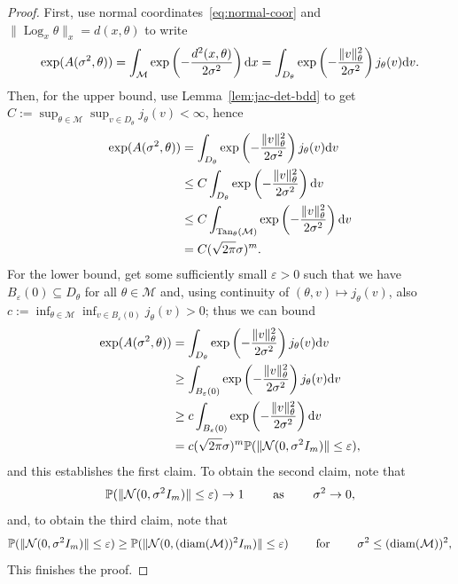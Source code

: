\documentclass[preprint]{imsart}
\theoremstyle{plain}
\theoremstyle{definition}
\newcommand{\Pbb}{\mathbb{P}}
\newcommand{\Ncal}{\mathcal{N}}
\newcommand{\Mcal}{\mathcal{M}}
\newcommand{\diff}{\textnormal{d}}
\DeclareMathOperator{\Tan}{Tan}
\DeclareMathOperator{\Log}{Log}
\DeclareMathOperator{\diam}{diam}
\begin{document}
\begin{appendix}
\begin{proof}
    First, use normal coordinates~\eqref{eq:normal-coor} and $\|\Log_x\theta\|_x =d(x,\theta)$ to write
    \begin{equation*}
        \exp(A(\sigma^2,\theta))= \int_{\Mcal}\exp\left(-\frac{d^2(x,\theta)}{2\sigma^2}\right)\diff x = \int_{D_\theta}\exp\left(-\frac{\|v\|^2_{\theta}}{2\sigma^2}\right)j_{\theta}(v)\diff v.
    \end{equation*}
    Then, for the upper bound, use Lemma~\ref{lem:jac-det-bdd} to get $C:=\sup_{\theta\in\Mcal}\sup_{v\in D_\theta} j_\theta(v)<\infty$, hence
    \begin{align*}
        \exp(A(\sigma^2,\theta)) &= \int_{D_\theta}\exp\left(-\frac{\|v\|^2_{\theta}}{2\sigma^2}\right)j_{\theta}(v)\diff v \\
        &\le C\int_{D_\theta}\exp\left(-\frac{\|v\|^2_{\theta}}{2\sigma^2}\right)\diff v \\
        &\le C\int_{\Tan_{\theta}(\Mcal)}\exp\left(-\frac{\|v\|^2_{\theta}}{2\sigma^2}\right)\diff v \\
        &= C(\sqrt{2\pi}\sigma)^m.
    \end{align*}
    For the lower bound, get some sufficiently small $\varepsilon>0$ such that we have $B_{\varepsilon}(0)\subseteq D_\theta$ for all $\theta\in\Mcal$ and, using continuity of $(\theta,v)\mapsto j_\theta(v)$,  also $c:=\inf_{\theta\in\Mcal}\inf_{v\in B_{\varepsilon}(0)}j_\theta(v)>0$; thus we can bound
    \begin{align*}
        \exp(A(\sigma^2,\theta)) &= \int_{D_\theta}\exp\left(-\frac{\|v\|^2_{\theta}}{2\sigma^2}\right)j_{\theta}(v)\diff v \\
        &\ge \int_{B_{\varepsilon}(0)}\exp\left(-\frac{\|v\|^2_{\theta}}{2\sigma^2}\right)j_{\theta}(v)\diff v \\
        &\ge c\int_{B_{\varepsilon}(0)}\exp\left(-\frac{\|v\|^2_{\theta}}{2\sigma^2}\right)\diff v \\
        &= c(\sqrt{2\pi}\sigma)^m\Pbb(\|\Ncal(0,\sigma^2I_m)\|\le \varepsilon),
    \end{align*}
    and this establishes the first claim.
    To obtain the second claim, note that 
    \begin{equation*}
        \Pbb(\|\Ncal(0,\sigma^2I_m)\|\le \varepsilon)\to 1\qquad \textnormal{ as }\qquad \sigma^2\to 0,
    \end{equation*}
    and, to obtain the third claim, note that
    \begin{equation*}
        \Pbb(\|\Ncal(0,\sigma^2I_m)\|\le \varepsilon)\ge \Pbb(\|\Ncal(0,(\diam(\Mcal))^2I_m)\|\le \varepsilon)\qquad \textnormal{ for }\qquad \sigma^2\le (\diam(\Mcal))^2,
    \end{equation*}
    This finishes the proof.    
\end{proof}


\end{appendix}
\end{document}
